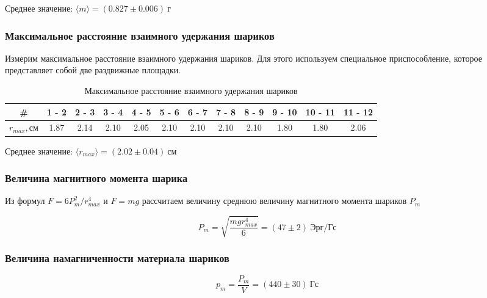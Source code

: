 \documentclass[a4paper, 12pt]{article}
\begin{document}
                Среднее значение: $\langle m \rangle = (0.827 \pm 0.006)~г$

            \subsubsection{Максимальное расстояние взаимного удержания шариков}

                Измерим максимальное расстояние взаимного удержания шариков. Для этого используем специальное приспособление, которое представляет собой две раздвижные площадки.

                \begin{table}[!ht]
                    \centering
                    \begin{tabular}{|c|c|c|c|c|c|c|c|c|c|c|c|}
                        \hline

                        \# & 1 - 2 & 2 - 3 & 3 - 4 & 4 - 5 & 5 - 6 & 6 - 7 & 7 - 8 & 8 - 9 & 9 - 10 & 10 - 11 & 11 - 12\\ \hline
                        $r_{max}, см$ & 1.87 & 2.14 & 2.10 & 2.05 & 2.10 & 2.10 & 2.10 & 2.10 & 1.80 & 1.80 & 2.06\\ \hline

                    \end{tabular}
                    \caption{Максимальное расстояние взаимного удержания шариков}
                    \label{table:r_max}
                \end{table}

                Среднее значение: $\langle r_{max} \rangle = (2.02 \pm 0.04)~см$

            \subsubsection{Величина магнитного момента шарика}

                Из формул $F = 6P_m^2 / r_{max}^4$ и $F = mg$ рассчитаем величину среднюю величину магнитного момента шариков $P_m$

                $$
                    P_m = \sqrt{\frac{m g r_{max}^4}{6}} = (47 \pm 2)~Эрг/Гс
                $$


            \subsubsection{Величина намагниченности материала шариков}

                $$
                    p_m = \frac{P_m}{V} = (440 \pm 30)~Гс
                $$
\end{document}
